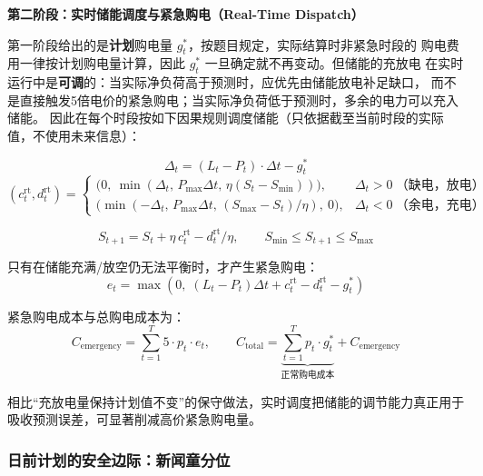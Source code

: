 \documentclass[12pt,a4paper]{article}
\begin{document}
\textbf{第二阶段：实时储能调度与紧急购电（Real-Time Dispatch）}

第一阶段给出的是\textbf{计划}购电量 $g_t^*$，按题目规定，实际结算时非紧急时段的
购电费用一律按计划购电量计算，因此 $g_t^*$ 一旦确定就不再变动。但储能的充放电
在实时运行中是\textbf{可调}的：当实际净负荷高于预测时，应优先由储能放电补足缺口，
而不是直接触发5倍电价的紧急购电；当实际净负荷低于预测时，多余的电力可以充入储能。
因此在每个时段按如下因果规则调度储能（只依据截至当前时段的实际值，不使用未来信息）：

\begin{equation}
    \Delta_t = \left(L_t - P_t\right) \cdot \Delta t - g_t^*
    \label{eq:q2_rt_delta}
\end{equation}
\begin{equation}
    \left(c_t^{\text{rt}}, d_t^{\text{rt}}\right)
    = \begin{cases}
        \big(0,\ \min(\Delta_t,\, P_{\max}\Delta t,\, \eta(S_t - S_{\min}))\big), & \Delta_t > 0\ \text{（缺电，放电）} \\[4pt]
        \big(\min(-\Delta_t,\, P_{\max}\Delta t,\, (S_{\max} - S_t)/\eta),\ 0\big), & \Delta_t < 0\ \text{（余电，充电）}
    \end{cases}
    \label{eq:q2_rt_dispatch}
\end{equation}

\begin{equation}
    S_{t+1} = S_t + \eta\, c_t^{\text{rt}} - d_t^{\text{rt}} / \eta, \qquad
    S_{\min} \leq S_{t+1} \leq S_{\max}
    \label{eq:q2_rt_soc}
\end{equation}

只有在储能充满/放空仍无法平衡时，才产生紧急购电：
\begin{equation}
    e_t = \max\left(0,\; \left(L_t - P_t\right)\Delta t + c_t^{\text{rt}}
                     - d_t^{\text{rt}} - g_t^*\right)
    \label{eq:q2_rt_emg}
\end{equation}

紧急购电成本与总购电成本为：
\begin{equation}
    C_{\text{emergency}} = \sum_{t=1}^{T} 5 \cdot p_t \cdot e_t, \qquad
    C_{\text{total}} = \underbrace{\sum_{t=1}^{T} p_t \cdot g_t^*}_{\text{正常购电成本}} + C_{\text{emergency}}
\end{equation}

相比“充放电量保持计划值不变”的保守做法，实时调度把储能的调节能力真正用于
吸收预测误差，可显著削减高价紧急购电量。

\subsubsection{日前计划的安全边际：新闻童分位}
\end{document}
